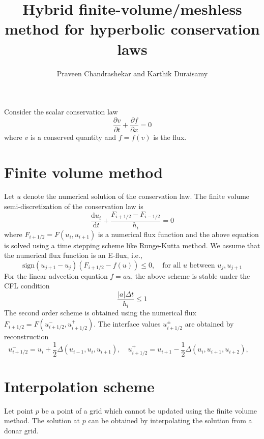 \documentclass[11pt]{amsart}
\title{Hybrid finite-volume/meshless method for hyperbolic conservation laws}
\author{Praveen Chandrashekar and Karthik Duraisamy}
\newcommand{\df}[2]{\frac{ \partial #1 }{ \partial #2 }}
\newcommand{\ud}{\textrm{d}}
\newcommand{\dd}[2]{\frac{ \ud #1 }{ \ud #2 }}
\begin{document}
\maketitle

Consider the scalar conservation law
\begin{equation}
\df{v}{t} + \df{f}{x} = 0
\end{equation}
where $v$ is a conserved quantity and $f=f(v)$ is the flux.

\section{Finite volume method}

Let $u$ denote the numerical solution of the conservation law. The finite volume semi-discretization of the conservation law is
\begin{equation}
\dd{u_i}{t} + \frac{F_{i+1/2} - F_{i-1/2}}{h_i} = 0
\end{equation}
where $F_{i+1/2} = F(u_i, u_{i+1})$ is a numerical flux function and the above equation is solved using a time stepping scheme like Runge-Kutta method. We assume that the numerical flux function is an E-flux, i.e.,
\begin{equation}
\textrm{sign}(u_{j+1} - u_j) ( F_{i+1/2} - f(u)) \le 0, \quad \textrm{for all $u$ between } u_j, u_{j+1}
\end{equation}
For the linear advection equation $f=au$, the above scheme is stable under the CFL condition
\begin{equation}
\frac{|a| \Delta t}{h_i} \le 1
\label{eq:fvcfl}
\end{equation}
The second order scheme is obtained using the numerical flux $F_{i+1/2} = F(u^-_{i+1/2}, u^+_{i+1/2})$. The interface values $u^\pm_{i+1/2}$ are obtained by reconstruction
\begin{equation}
u^-_{i+1/2} = u_i + \frac{1}{2} \Delta(u_{i-1}, u_i, u_{i+1}), \quad
u^+_{i+1/2} = u_{i+1} - \frac{1}{2} \Delta(u_{i}, u_{i+1}, u_{i+2}), \quad
\end{equation}

\section{Interpolation scheme}

Let point $p$ be a point of a grid which cannot be updated using the finite volume method. The solution at $p$ can be obtained by interpolating the solution from a donar grid.
\end{document}
